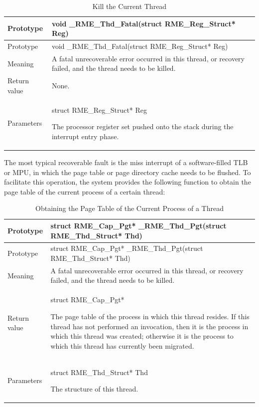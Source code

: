 \begin{xltabular}{\textwidth}{@{}>{\hsize\raggedright\arraybackslash}X>{\hsize\raggedright\arraybackslash}X@{}}
\caption{Kill the Current Thread}\label{tab:7-22-kill-current-thread}\\
\toprule
Prototype & void \_RME\_Thd\_Fatal(struct RME\_Reg\_Struct* Reg)\tabularnewline
\endfirsthead
\toprule
Prototype & void \_RME\_Thd\_Fatal(struct RME\_Reg\_Struct* Reg)\tabularnewline
\midrule
\endhead
\bottomrule
\endlastfoot
Meaning &
A fatal unrecoverable error occurred in this thread, or recovery failed, and the thread needs to be killed.\tabularnewline
Return value & None.\tabularnewline
Parameters\strut
 & struct RME\_Reg\_Struct* Reg

The processor register set pushed onto the stack during the interrupt entry phase.\strut
\tabularnewline
\end{xltabular}
\nopagebreak[4]

The most typical recoverable fault is the miss interrupt of a software-filled TLB or MPU, in which the page table or page directory cache needs to be flushed. To facilitate this operation, the system provides the following function to obtain the page table of the current process of a certain thread:

\begin{xltabular}{\textwidth}{@{}>{\hsize\raggedright\arraybackslash}X>{\hsize\raggedright\arraybackslash}X@{}}
\caption{Obtaining the Page Table of the Current Process of a Thread}\label{tab:7-23-get-thread-current-process-page-table}\\
\toprule
Prototype & struct RME\_Cap\_Pgt* \_RME\_Thd\_Pgt(struct RME\_Thd\_Struct*
Thd)\tabularnewline
\endfirsthead
\toprule
Prototype & struct RME\_Cap\_Pgt* \_RME\_Thd\_Pgt(struct RME\_Thd\_Struct*
Thd)\tabularnewline
\midrule
\endhead
\bottomrule
\endlastfoot
Meaning &
A fatal unrecoverable error occurred in this thread, or recovery failed, and the thread needs to be killed.\tabularnewline
Return value\strut
 & struct RME\_Cap\_Pgt*

The page table of the process in which this thread resides. If this thread has not performed an invocation, then it is the process in which this thread was created; otherwise it is the process to which this thread has currently been migrated.\strut
\tabularnewline
Parameters\strut
 & struct RME\_Thd\_Struct* Thd

The structure of this thread.\strut
\tabularnewline
\end{xltabular}
\nopagebreak[4]

